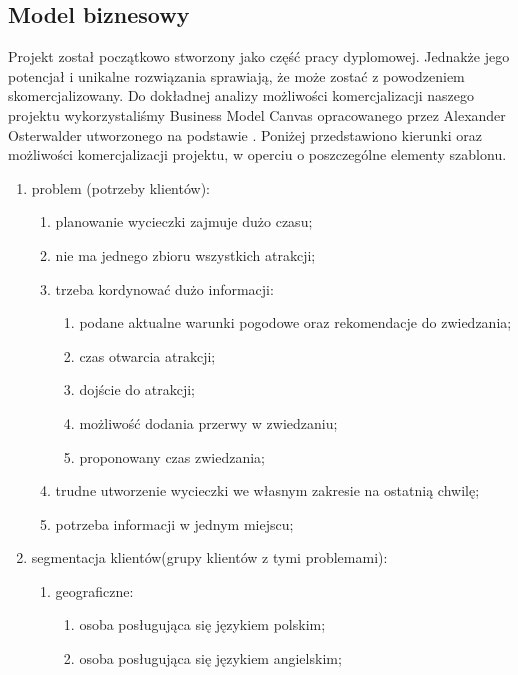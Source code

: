 \subsection{Model biznesowy}
\label{sec:aspekty-biznesowy}
Projekt został początkowo stworzony jako część pracy dyplomowej. Jednakże jego potencjał i unikalne rozwiązania sprawiają, że może zostać z powodzeniem skomercjalizowany.
Do dokładnej analizy możliwości komercjalizacji naszego projektu wykorzystaliśmy Business Model Canvas opracowanego przez Alexander Osterwalder  utworzonego na podstawie \cite{bmc}.
Poniżej przedstawiono kierunki oraz możliwości komercjalizacji projektu, w operciu o poszczególne elementy szablonu.
\begin{enumerate}[label=\Roman*.]
    \item problem (potrzeby klientów):
    \begin{enumerate}[label=\alph*.]
        \item planowanie wycieczki zajmuje dużo czasu;
        \item nie ma jednego zbioru wszystkich atrakcji;
        \item trzeba kordynować dużo informacji:
        \begin{enumerate}[label=\roman*.]
            \item podane aktualne warunki pogodowe oraz rekomendacje do zwiedzania;
            \item czas otwarcia atrakcji;
            \item dojście do atrakcji;
            \item możliwość dodania przerwy w zwiedzaniu;
            \item proponowany czas zwiedzania;
        \end{enumerate}
        \item trudne utworzenie wycieczki we własnym zakresie na ostatnią chwilę;
        \item potrzeba informacji w jednym miejscu;
    \end{enumerate}
    \item segmentacja klientów(grupy klientów z tymi problemami):
    \begin{enumerate}[label=\alph*.]
        \item geograficzne:
        \begin{enumerate}[label=\roman*.]
            \item osoba posługująca się językiem polskim;
            \item osoba posługująca się językiem angielskim;

\end{enumerate}
\end{enumerate}
\end{enumerate}

